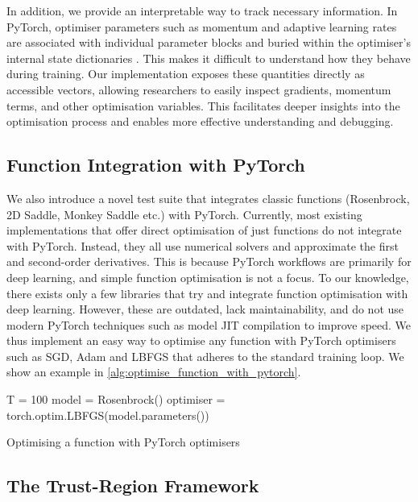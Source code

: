 In addition, we provide an interpretable way to track necessary information. In PyTorch, optimiser parameters such as momentum and adaptive learning rates are associated with individual parameter blocks and buried within the optimiser's internal state dictionaries \citep{pytorch}. This makes it difficult to understand how they behave during training. Our implementation exposes these quantities directly as accessible vectors, allowing researchers to easily inspect gradients, momentum terms, and other optimisation variables. This facilitates deeper insights into the optimisation process and enables more effective understanding and debugging.

\subsection{Function Integration with PyTorch}
\label{ssec:function_integration_with_pytorch}

We also introduce a novel test suite that integrates classic functions (Rosenbrock, 2D Saddle, Monkey Saddle etc.) with PyTorch. Currently, most existing implementations that offer direct optimisation of just functions do not integrate with PyTorch. Instead, they all use numerical solvers and approximate the first and second-order derivatives. This is because PyTorch workflows are primarily for deep learning, and simple function optimisation is not a focus. To our knowledge, there exists only a few libraries that try and integrate function optimisation with deep learning. However, these are outdated, lack maintainability, and do not use modern PyTorch techniques such as model JIT compilation to improve speed. We thus implement an easy way to optimise any function with PyTorch optimisers such as SGD, Adam and LBFGS that adheres to the standard training loop. We show an example in \cref{alg:optimise_function_with_pytorch}.

\begin{algorithm}[h]
    \small
    \DontPrintSemicolon
    T = 100\;
    model = Rosenbrock()\;
    optimiser = torch.optim.LBFGS(model.parameters())\;
    \caption{Optimising a function with PyTorch optimisers}
    \label{alg:optimise_function_with_pytorch}
\end{algorithm}


\subsection{The Trust-Region Framework}
\label{ssec:the_trust_region_framework}


